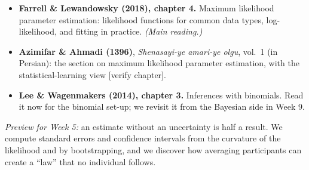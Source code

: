 \begin{itemize}
\tightlist
\item
  \textbf{Farrell \& Lewandowsky (2018), chapter 4.} Maximum likelihood
  parameter estimation: likelihood functions for common data types,
  log-likelihood, and fitting in practice. \emph{(Main reading.)}
\item
  \textbf{Azimifar \& Ahmadi (1396)}, \emph{Shenasayi-ye amari-ye olgu},
  vol.~1 (in Persian): the section on maximum likelihood parameter
  estimation, with the statistical-learning view {[}verify chapter{]}.
\item
  \textbf{Lee \& Wagenmakers (2014), chapter 3.} Inferences with
  binomials. Read it now for the binomial set-up; we revisit it from the
  Bayesian side in Week 9.
\end{itemize}

\emph{Preview for Week 5:} an estimate without an uncertainty is half a
result. We compute standard errors and confidence intervals from the
curvature of the likelihood and by bootstrapping, and we discover how
averaging participants can create a ``law'' that no individual follows.

